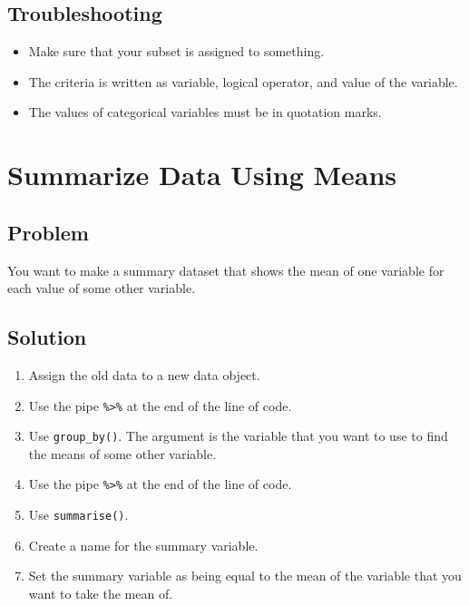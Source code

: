 \documentclass[
]{book}
\providecommand{\tightlist}{%
  \setlength{\itemsep}{0pt}\setlength{\parskip}{0pt}}
\begin{document}
\hypertarget{troubleshooting-14}{%
\subsection{Troubleshooting}\label{troubleshooting-14}}

\begin{itemize}
\tightlist
\item
  Make sure that your subset is assigned to something.
\item
  The criteria is written as variable, logical operator, and value of the variable.
\item
  The values of categorical variables must be in quotation marks.
\end{itemize}

\hypertarget{sum}{%
\section{Summarize Data Using Means}\label{sum}}

\hypertarget{problem-17}{%
\subsection{Problem}\label{problem-17}}

You want to make a summary dataset that shows the mean of one variable for each value of some other variable.

\hypertarget{solution-16}{%
\subsection{Solution}\label{solution-16}}

\begin{enumerate}
\def\labelenumi{\arabic{enumi}.}
\tightlist
\item
  Assign the old data to a new data object.
\item
  Use the pipe \texttt{\%\textgreater{}\%} at the end of the line of code.
\item
  Use \texttt{group\_by()}. The argument is the variable that you want to use to find the means of some other variable.
\item
  Use the pipe \texttt{\%\textgreater{}\%} at the end of the line of code.
\item
  Use \texttt{summarise()}.
\item
  Create a name for the summary variable.
\item
  Set the summary variable as being equal to the mean of the variable that you want to take the mean of.
\end{enumerate}
\end{document}
